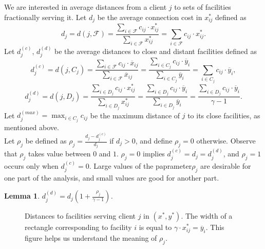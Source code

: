 \documentclass[11pt]{article}
\newtheorem{lemma}[theorem]{Lemma}
\newcommand{\F}{\mathcal{F}}
\begin{document}
We are interested in average distances from a client $j$ to sets of facilities fractionally serving it.
Let $d_j$ be the average connection cost in $x^*_{ij}$ defined as
\[
d_j = d(j, \F) = \frac{\sum_{i \in \F} c_{ij} \cdot x^*_{ij} }{\sum_{i \in \F} x^*_{ij}}  = \sum_{i \in \F} c_{ij} \cdot x^*_{ij}.
\]
Let $d^{(c)}_j$, $d^{(d)}_j$  be the average distances to close and distant facilities defined as
\[
d^{(c)}_j = d(j,C_j) = \frac{\sum_{i \in \F} c_{ij} \cdot \overline{x}_{ij} }{\sum_{i \in \F} \overline{x}_{ij}}
= \frac{\sum_{i \in C_j} c_{ij} \cdot \overline{y}_{i} }{\sum_{i \in C_j} \overline{y}_{i}}  = \sum_{i \in C_j} c_{ij} \cdot \overline{y}_{i},
\]
\[
d^{(d)}_j = d(j,D_j) = \frac{\sum_{i \in D_j} c_{ij} \cdot x^*_{ij} }{\sum_{i \in D_j} x^*_{ij}}
= \frac{\sum_{i \in D_j} c_{ij} \cdot \overline{y}_{i} }{\sum_{i \in D_j} \overline{y}_{i}}
 = \frac{\sum_{i \in D_j} c_{ij} \cdot \overline{y}_{i} }{\gamma - 1}.
\]
Let $d^{(max)}_j = \max_{i \in C_j} c_{ij}$ be the maximum distance of
$j$ to its close facilities, as mentioned above. \\
Let $\rho_j$ be defined as
$
 \rho_j = \frac{d_j - d^{(c)}_j}{d_j}
$
if $d_j > 0$, and define $\rho_j = 0$ otherwise.
Observe that $\rho_j$ takes value between $0$ and $1$.
$\rho_j = 0$ implies $d^{(c)}_j = d_j = d^{(d)}_j$, and
$\rho_j = 1$ occurs only when $d^{(c)}_j = 0$.  Large values of the paprameter$\rho_j$
are desirable for one part of the analysis, and small values are good for 
another part. 

\begin{lemma} \label{average_lemma}
 $d^{(d)}_j = d_j (1+ \frac{\rho_j}{\gamma -1})$.
\end{lemma}


\begin{figure}[t]
\begin{center}
\end{center}
\caption{Distances to facilities serving client $j$ in $(x^*,y^*)$. The width of a rectangle corresponding to facility $i$
is equal to $\gamma \cdot x^*_{ij} = \overline{y}_i$. This figure helps 
us understand the meaning of $\rho_j$.}
\label{fig:distances}
\end{figure}
\end{document}

